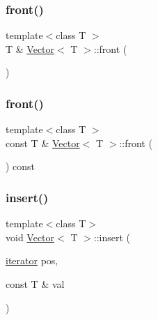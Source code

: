 \mbox{\label{classVector_a0061cc9127a9cbf541439121998a1fdd_a0061cc9127a9cbf541439121998a1fdd}} 
\subsubsection{\texorpdfstring{front()}{front()}\hspace{0.1cm}{\footnotesize\ttfamily [1/2]}}
{\footnotesize\ttfamily template$<$class T $>$ \\
T \& \hyperlink{classVector}{Vector}$<$ T $>$\+::front (\begin{DoxyParamCaption}{ }\end{DoxyParamCaption})}

\mbox{\label{classVector_ae891494a5654af2db2a00d162c50985a_ae891494a5654af2db2a00d162c50985a}} 
\subsubsection{\texorpdfstring{front()}{front()}\hspace{0.1cm}{\footnotesize\ttfamily [2/2]}}
{\footnotesize\ttfamily template$<$class T $>$ \\
const T \& \hyperlink{classVector}{Vector}$<$ T $>$\+::front (\begin{DoxyParamCaption}{ }\end{DoxyParamCaption}) const}

\mbox{\label{classVector_addc1810308998ea4ecb85157edf8f023_addc1810308998ea4ecb85157edf8f023}} 
\subsubsection{\texorpdfstring{insert()}{insert()}\hspace{0.1cm}{\footnotesize\ttfamily [1/2]}}
{\footnotesize\ttfamily template$<$class T$>$ \\
void \hyperlink{classVector}{Vector}$<$ T $>$\+::insert (\begin{DoxyParamCaption}\item[{\hyperlink{classVector_1_1iterator}{iterator}}]{pos,  }\item[{const T \&}]{val }\end{DoxyParamCaption})}

